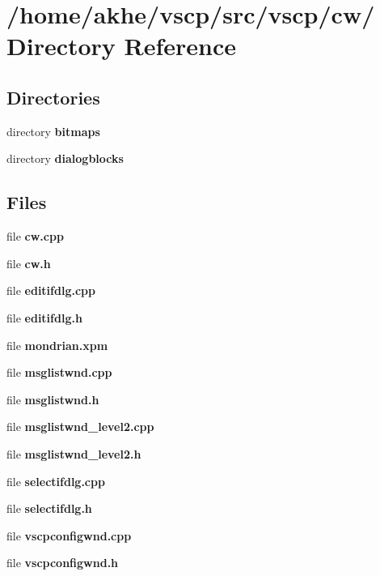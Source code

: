 \section{/home/akhe/vscp/src/vscp/cw/ Directory Reference}
\label{dir_fa1ae58ed1adb9d49307919780bd5898}
\subsection*{Directories}
\begin{CompactItemize}
\item 
directory {\bf bitmaps}
\item 
directory {\bf dialogblocks}
\end{CompactItemize}
\subsection*{Files}
\begin{CompactItemize}
\item 
file \textbf{cw.cpp}
\item 
file \textbf{cw.h}
\item 
file \textbf{editifdlg.cpp}
\item 
file \textbf{editifdlg.h}
\item 
file \textbf{mondrian.xpm}
\item 
file \textbf{msglistwnd.cpp}
\item 
file \textbf{msglistwnd.h}
\item 
file \textbf{msglistwnd\_\-level2.cpp}
\item 
file \textbf{msglistwnd\_\-level2.h}
\item 
file \textbf{selectifdlg.cpp}
\item 
file \textbf{selectifdlg.h}
\item 
file \textbf{vscpconfigwnd.cpp}
\item 
file \textbf{vscpconfigwnd.h}
\end{CompactItemize}
